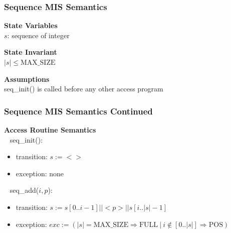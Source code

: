 \documentclass[t, 12pt, numbers, fleqn, handout]{beamer}
\begin{document}

\begin{frame}
\frametitle{Sequence MIS Semantics}

\textbf{State Variables}\\
$s$: sequence of integer
~\newline

\textbf{State Invariant}\\
$| s | \leq \mathrm{MAX\_SIZE}$
~\newline

\textbf{Assumptions}\\
seq\_init() is called before any other access program

\end{frame}


\begin{frame}
\frametitle{Sequence MIS Semantics Continued}

\textbf{Access Routine Semantics}\\
~\newline
seq\_init():
\begin{itemize}
\item transition: $s := < >$
\item exception: none
\end{itemize}
~\newline
\noindent seq\_add($i, p$):
\begin{itemize}
\item transition: $s := s[0..i-1] || <p> || s[i..|s|-1]$
\item exception: $exc := (|s| = \mathrm{MAX\_SIZE} \Rightarrow  \mathrm{FULL} ~ | ~ i \notin [0..|s|] \Rightarrow
\mathrm{POS})$
\end{itemize}

\end{frame}

\end{document}
